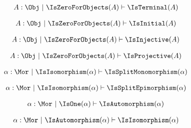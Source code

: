 \begin{sequent}
\begin{align*}
  A:\Obj ~|~ \IsZeroForObjects( A ) \vdash \IsTerminal( A )
\end{align*}
\end{sequent}

\begin{sequent}
\begin{align*}
  A:\Obj ~|~ \IsZeroForObjects( A ) \vdash \IsInitial( A )
\end{align*}
\end{sequent}

\begin{sequent}
\begin{align*}
  A:\Obj ~|~ \IsZeroForObjects( A ) \vdash \IsInjective( A )
\end{align*}
\end{sequent}

\begin{sequent}
\begin{align*}
  A:\Obj ~|~ \IsZeroForObjects( A ) \vdash \IsProjective( A )
\end{align*}
\end{sequent}

\begin{sequent}
\begin{align*}
  \alpha:\Mor ~|~ \IsIsomorphism( \alpha ) \vdash \IsSplitMonomorphism( \alpha )
\end{align*}
\end{sequent}

\begin{sequent}
\begin{align*}
  \alpha:\Mor ~|~ \IsIsomorphism( \alpha ) \vdash \IsSplitEpimorphism( \alpha )
\end{align*}
\end{sequent}

\begin{sequent}
\begin{align*}
  \alpha:\Mor ~|~ \IsOne( \alpha ) \vdash \IsAutomorphism( \alpha )
\end{align*}
\end{sequent}

\begin{sequent}
\begin{align*}
  \alpha:\Mor ~|~ \IsAutomorphism( \alpha ) \vdash \IsIsomorphism( \alpha )
\end{align*}
\end{sequent}


